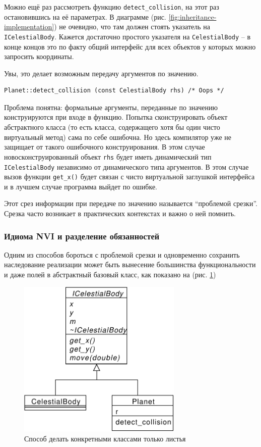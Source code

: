 \documentclass[a4paper,12pt,oneside]{article}
\begin{document}
Можно ещё раз рассмотреть функцию \lstinline!detect_collision!, на этот раз остановившись на её параметрах. В диаграмме (рис. \ref{fig:inheritance-implementation}) не очевидно, что там должен стоять указатель на \lstinline!ICelestialBody!. Кажется достаточно простого указателя на \lstinline!CelestialBody! -- в конце концов это по факту общий интерфейс для всех объектов у которых можно запросить координаты.

Увы, это делает возможным передачу аргументов по значению.

\begin{lstlisting}
Planet::detect_collision (const CelestialBody rhs) /* Oops */
\end{lstlisting}

Проблема понятна: формальные аргументы, переданные по значению конструируются при входе в функцию. Попытка сконструировать объект абстрактного класса (то есть класса, содержащего хотя бы один чисто виртуальный метод) сама по себе ошибочна. Но здесь компилятор уже не защищает от такого ошибочного конструирования. В этом случае новосконструированный объект \lstinline!rhs! будет иметь динамический тип \lstinline!ICelestialBody! независимо от динамического типа аргументов. В этом случае вызов функции \lstinline!get_x()! будет связан с чисто виртуальной заглушкой интерфейса и в лучшем случае программа выйдет по ошибке. 

Этот срез информации при передаче по значению называется ``проблемой срезки''. Срезка часто возникает в практических контекстах и важно о ней помнить.

\subsubsection{Идиома NVI и разделение обязанностей}\label{NVI}

Одним из способов бороться с проблемой срезки и одновременно сохранить наследование реализации может быть вынесение большинства функциональности и даже полей в абстрактный базовый класс, как показано на (рис. \ref{fig:better-implinhh})

\begin{figure}[h!]
\centering
\includegraphics[width=0.7\textwidth]{illustrations/better-implinh-crop.pdf}
\caption{Способ делать конкретными классами только листья}
\label{fig:better-implinhh}
\end{figure}
\end{document}
